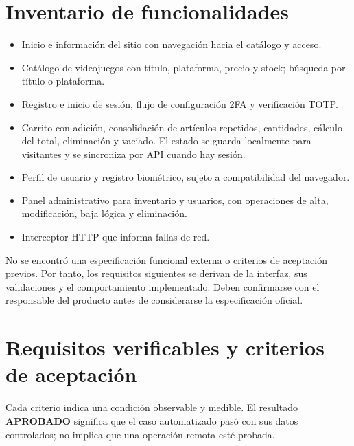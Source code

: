 \documentclass[11pt,letterpaper]{article}
\newcommand{\aprobado}{\textbf{APROBADO}}
\begin{document}
\section{Inventario de funcionalidades}
\begin{itemize}[leftmargin=1.5em]
  \item Inicio e información del sitio con navegación hacia el catálogo y acceso.
  \item Catálogo de videojuegos con título, plataforma, precio y stock; búsqueda por título o
  plataforma.
  \item Registro e inicio de sesión, flujo de configuración 2FA y verificación TOTP.
  \item Carrito con adición, consolidación de artículos repetidos, cantidades, cálculo del total,
  eliminación y vaciado. El estado se guarda localmente para visitantes y se sincroniza por API
  cuando hay sesión.
  \item Perfil de usuario y registro biométrico, sujeto a compatibilidad del navegador.
  \item Panel administrativo para inventario y usuarios, con operaciones de alta, modificación,
  baja lógica y eliminación.
  \item Interceptor HTTP que informa fallas de red.
\end{itemize}

No se encontró una especificación funcional externa o criterios de aceptación previos. Por tanto,
los requisitos siguientes se derivan de la interfaz, sus validaciones y el comportamiento
implementado. Deben confirmarse con el responsable del producto antes de considerarse la
especificación oficial.

\section{Requisitos verificables y criterios de aceptación}
Cada criterio indica una condición observable y medible. El resultado \aprobado{} significa que
el caso automatizado pasó con sus datos controlados; no implica que una operación remota esté
probada.
\end{document}
